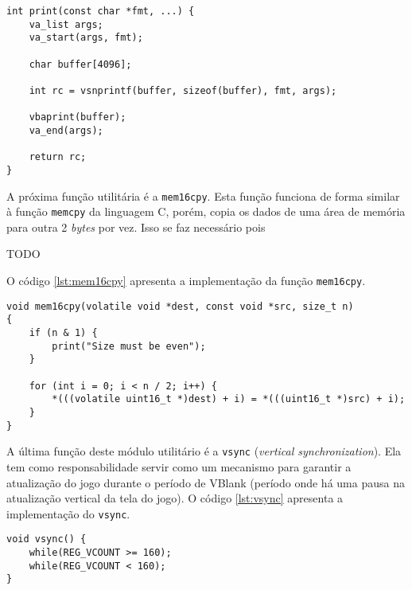 \begin{lstlisting}[float,caption={Implementação da função \texttt{print}},label={lst:utilsprint}]
int print(const char *fmt, ...) {
    va_list args;
    va_start(args, fmt);

    char buffer[4096];

    int rc = vsnprintf(buffer, sizeof(buffer), fmt, args);

    vbaprint(buffer);
    va_end(args);

    return rc;
}
\end{lstlisting}

A próxima função utilitária é a \texttt{mem16cpy}. Esta função funciona de forma similar à função \texttt{memcpy} da linguagem C, porém, copia os dados de uma área de memória para outra 2 \textit{bytes} por vez. Isso se faz necessário pois

TODO

O código \ref{lst:mem16cpy} apresenta a implementação da função \texttt{mem16cpy}.

\begin{lstlisting}[caption={Implementação da função \texttt{mem16cpy}},label={lst:mem16cpy}]
void mem16cpy(volatile void *dest, const void *src, size_t n)
{
    if (n & 1) {
        print("Size must be even");
    }

    for (int i = 0; i < n / 2; i++) {
        *(((volatile uint16_t *)dest) + i) = *(((uint16_t *)src) + i);
    }
}
\end{lstlisting}

A última função deste módulo utilitário é a \texttt{vsync} (\textit{vertical synchronization}). Ela tem como responsabilidade servir como um mecanismo para garantir a atualização do jogo durante o período de VBlank (período onde há uma pausa na atualização vertical da tela do jogo). O código \ref{lst:vsync} apresenta a implementação do \texttt{vsync}.

\begin{lstlisting}[caption={Implementação da função \texttt{vsync}},label={lst:vsync}]
void vsync() {
    while(REG_VCOUNT >= 160);
    while(REG_VCOUNT < 160);
}
\end{lstlisting}